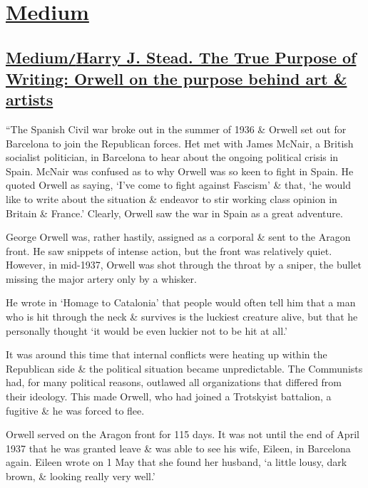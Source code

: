 \documentclass[oneside]{book}
\numberwithin{equation}{section}
\begin{document}

\chapter{\href{https://medium.com/}{Medium}}

\section{\href{https://medium.com/personal-growth/george-orwell-why-your-writing-must-have-purpose-77a3e94d6692}{Medium\texttt{/}Harry J. Stead. The True Purpose of Writing: Orwell on the purpose behind art \& artists}}
``The Spanish Civil war broke out in the summer of 1936 \& Orwell set out for Barcelona to join the Republican forces. Het met with James McNair, a British socialist politician, in Barcelona to hear about the ongoing political crisis in Spain. McNair was confused as to why Orwell was so keen to fight in Spain. He quoted Orwell as saying, `I've come to fight against Fascism' \& that, `he would like to write about the situation \& endeavor to stir working class opinion in Britain \& France.' Clearly, Orwell saw the war in Spain as a great adventure.

George Orwell was, rather hastily, assigned as a corporal \& sent to the Aragon front. He saw snippets of intense action, but the front was relatively quiet. However, in mid-1937, Orwell was shot through the throat by a sniper, the bullet missing the major artery only by a whisker.

He wrote in `Homage to Catalonia' that people would often tell him that a man who is hit through the neck \& survives is the luckiest creature alive, but that he personally thought `it would be even luckier not to be hit at all.'

It was around this time that internal conflicts were heating up within the Republican side \& the political situation became unpredictable. The Communists had, for many political reasons, outlawed all organizations that differed from their ideology. This made Orwell, who had joined a Trotskyist battalion, a fugitive \& he was forced to flee.

Orwell served on the Aragon front for 115 days. It was not until the end of April 1937 that he was granted leave \& was able to see his wife, Eileen, in Barcelona again. Eileen wrote on 1 May that she found her husband, `a little lousy, dark brown, \& looking really very well.'
\end{document}
